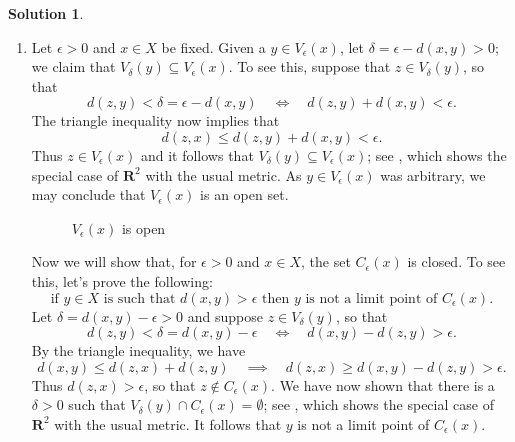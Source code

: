 \documentclass[12pt]{article}
\theoremstyle{definition}
\theoremstyle{exercise}
\theoremstyle{solution}
\newtheorem*{solution}{Solution}
\newcommand{\quimplies}{\quad \implies \quad}
\newcommand{\quiff}{\quad \iff \quad}
\newcommand{\R}{\mathbf{R}}
\begin{document}
\begin{solution}
    \begin{enumerate}
        \item Let \( \epsilon > 0 \) and \( x \in X \) be fixed. Given a \( y \in V_{\epsilon}(x) \), let \( \delta = \epsilon - d(x, y) > 0 \); we claim that \( V_{\delta}(y) \subseteq V_{\epsilon}(x) \). To see this, suppose that \( z \in V_{\delta}(y) \), so that
        \[
            d(z, y) < \delta = \epsilon - d(x, y) \quiff d(z, y) + d(x, y) < \epsilon.
        \]
        The triangle inequality now implies that
        \[
            d(z, x) \leq d(z, y) + d(x, y) < \epsilon.
        \]
        Thus \( z \in V_{\epsilon}(x) \) and it follows that \( V_{\delta}(y) \subseteq V_{\epsilon}(x) \); see , which shows the special case of \( \R^2 \) with the usual metric. As \( y \in V_{\epsilon}(x) \) was arbitrary, we may conclude that \( V_{\epsilon}(x) \) is an open set.

        \begin{figure}[H]
            \centering
            \caption{\( V_{\epsilon}(x) \) is open}
            \label{fig:3}
        \end{figure}

        Now we will show that, for \( \epsilon > 0 \) and \( x \in X \), the set \( C_{\epsilon}(x) \) is closed. To see this, let's prove the following:
        \[
            \text{if } y \in X \text{ is such that } d(x, y) > \epsilon \text{ then } y \text{ is not a limit point of } C_{\epsilon}(x).
        \]
        Let \( \delta = d(x, y) - \epsilon > 0 \) and suppose \( z \in V_{\delta}(y) \), so that
        \[
            d(z, y) < \delta = d(x, y) - \epsilon \quiff d(x, y) - d(z, y) > \epsilon.
        \]
        By the triangle inequality, we have
        \[
            d(x, y) \leq d(z, x) + d(z, y) \quimplies d(z, x) \geq d(x, y) - d(z, y) > \epsilon.
        \]
        Thus \( d(z, x) > \epsilon \), so that \( z \not\in C_{\epsilon}(x) \). We have now shown that there is a \( \delta > 0 \) such that \( V_{\delta}(y) \cap C_{\epsilon}(x) = \emptyset \); see , which shows the special case of \( \R^2 \) with the usual metric. It follows that \( y \) is not a limit point of \( C_{\epsilon}(x) \).


\end{enumerate}
\end{solution}
\end{document}
